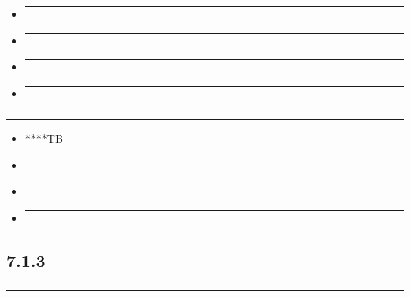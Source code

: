 \begin{itemize}
\item
  \begin{center}\rule{0.5\linewidth}{0.5pt}\end{center}
\item
  \begin{center}\rule{0.5\linewidth}{0.5pt}\end{center}
\item
  \begin{center}\rule{0.5\linewidth}{0.5pt}\end{center}
\item
  \begin{center}\rule{0.5\linewidth}{0.5pt}\end{center}
\end{itemize}

\subsubsection{}\label{section-21}

\begin{center}\rule{0.5\linewidth}{0.5pt}\end{center}

\begin{itemize}
\item
  ****TB
\item
  \begin{center}\rule{0.5\linewidth}{0.5pt}\end{center}
\item
  \begin{center}\rule{0.5\linewidth}{0.5pt}\end{center}
\item
  \begin{center}\rule{0.5\linewidth}{0.5pt}\end{center}
\end{itemize}

\subsection{7.1.3}\label{section-22}

\subsubsection{}\label{section-23}

\begin{center}\rule{0.5\linewidth}{0.5pt}\end{center}

